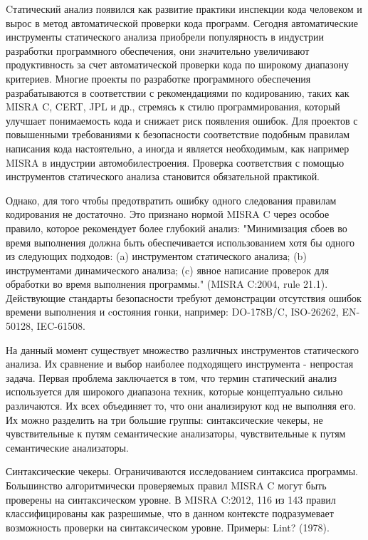 
{\actuality} Cтатический анализ появился как развитие практики инспекции кода человеком и вырос в метод автоматической проверки кода программ.
Сегодня автоматические инструменты статического анализа приобрели 
популярность в индустрии разработки программного обеспечения, они 
значительно увеличивают продуктивность за счет автоматической проверки кода по
широкому диапазону критериев. Многие проекты по разработке программного обеспечения 
разрабатываются в соответствии с рекомендациями по кодированию,
таких как MISRA C\cite{Misrac1998}, CERT\cite{CERT}, JPL\cite{JPL} и др., стремясь к стилю программирования, 
который улучшает понимаемость кода и снижает риск появления ошибок. Для проектов с
повышенными требованиями к безопасности соответствие подобным правилам написания
кода настоятельно, а иногда и является необходимым, как например MISRA в индустрии автомобилестроения.
Проверка соответствия с помощью инструментов статического анализа становится обязательной 
практикой.

Однако, для того чтобы предотвратить ошибку одного следования правилам кодирования
не достаточно. Это признано нормой MISRA C через особое правило,
которое рекомендует более глубокий анализ: "Минимизация сбоев во время выполнения 
должна быть обеспечивается использованием хотя бы одного из следующих подходов: 
(a) инструментом статического анализа; (b) инструментами динамического анализа;
(c) явное написание проверок для обработки во время выполнения программы." 
(MISRA C:2004, rule 21.1). Действующие стандарты безопасности требуют демонстрации
отсутствия ошибок времени выполнения и cостояния гонки, например: DO-178B/C, ISO-26262,
EN-50128, IEC-61508.

На данный момент существует множество различных инструментов статического анализа.
Их сравнение и выбор наиболее подходящего инструмента - непростая задача. 
Первая проблема заключается в том, что термин статический анализ используется 
для широкого диапазона техник, которые концептуально сильно различаются.
Их всех объединяет то, что они анализируют код не выполняя его. Их можно
разделить на три большие группы: синтаксические чекеры, не чувствительные к путям 
семантические анализаторы, чувствительные к путям семантические анализаторы. 

Синтаксические чекеры. Ограничиваются исследованием синтаксиса программы. 
Большинство алгоритмически проверяемых правил MISRA C могут быть проверены 
на синтаксическом уровне. В MISRA C:2012, 116 из 143 правил классифицированы 
как разрешимые, что в данном контексте подразумевает возможность проверки 
на синтаксическом уровне. Примеры: Lint? (1978). 

